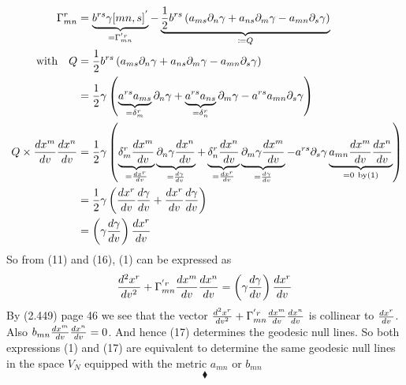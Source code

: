 \begin{align}
\Gamma^r_{mn} & =\underbrace{b^{rs}\gamma[mn,s]^{'}}_{=\Gamma^{'r}_{mn}}  - \underbrace{\frac{1}{2} b^{rs}\left( a_{ms}\partial_n \gamma+a_{ns}\partial_m \gamma-a_{mn}\partial_s \gamma \right)}_{\coloneqq Q}\\
\text{with}\quad Q &= \frac{1}{2} b^{rs}\left( a_{ms}\partial_n \gamma+a_{ns}\partial_m \gamma-a_{mn}\partial_s \gamma \right)\\
&= \frac{1}{2} \gamma \left( \underbrace{a^{rs}a_{ms}}_{ = \delta^r_m}\partial_n \gamma+\underbrace{a^{rs}a_{ns}}_{ = \delta^r_n}\partial_m \gamma-a^{rs}a_{mn}\partial_s \gamma \right)\\
\ Q \times \dv{x^m}{v}\dv{x^n}{v} &= \frac{1}{2} \gamma \left( \underbrace{\delta^r_m\dv{x^m}{v}}_{=\dv{x^r}{v}} \underbrace{\partial_n \gamma \dv{x^n}{v}}_{= \dv{\gamma}{v}}+\underbrace{\delta^r_n\dv{x^n}{v}}_{=\dv{x^r}{v}}\underbrace{\partial_m \gamma\dv{x^m}{v}}_{= \dv{\gamma}{v}}-a^{rs}\partial_s \gamma \underbrace{a_{mn}\dv{x^m}{v}\dv{x^n}{v}}_{ = 0 \ \text{by(1)}} \right)\\
&= \frac{1}{2} \gamma \left( \dv{x^r}{v}\dv{\gamma}{v} +\dv{x^r}{v}\dv{\gamma}{v} \right)\\
&= \left(\gamma\dv{\gamma}{v} \right)  \dv{x^r}{v}
\end{align}
So from (11) and (16), (1) can be expressed as 
\begin{align}
\dv[2]{x^r}{v} + \Gamma^{'r}_{mn}\dv{x^m}{v}\dv{x^n}{v} = \left(\gamma\dv{\gamma}{v} \right)  \dv{x^r}{v}
\end{align}
By (2.449) page 46 we see that the vector 
$\dv[2]{x^r}{v} + \Gamma^{'r}_{mn}\dv{x^m}{v}\dv{x^n}{v}$ is collinear to $\dv{x^r}{v}$. Also $b_{mn}\dv{x^m}{v}\dv{x^n}{v} = 0$. And hence (17) determines the geodesic null lines. So both expressions (1) and (17) are equivalent to determine the same geodesic null lines in the space $V_N$ equipped with the metric $a_{mn}$ or  $b_{mn}$
$$\blacklozenge$$
\newpage


